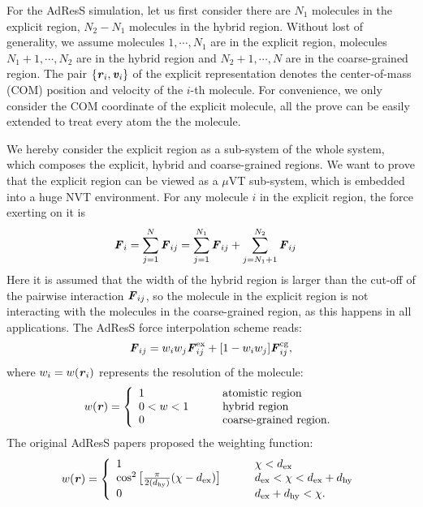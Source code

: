 \documentclass[aps,pre,preprint,unsortedaddress]{revtex4}
\renewcommand{\v}[1]{\textbf{\textit{#1}}}
\begin{document}
For the AdResS simulation, let us first consider there are $N_1$
molecules in the explicit region, $N_2 - N_1$ molecules in the hybrid
region.  Without lost of generality, we assume molecules $1, \cdots,
N_1$ are in the explicit region, molecules $N_1 + 1, \cdots, N_2$ are
in the hybrid region and $N_2+1, \cdots, N$ are in the coarse-grained
region. The pair $\{\v r_i, \v v_i\}$ of the explicit representation
denotes the center-of-mass (COM) position and velocity of the $i$-th
molecule. For convenience, we only consider the COM coordinate of the
explicit molecule, all the prove can be easily extended to treat every
atom the the molecule.

We hereby consider the explicit region as a sub-system of the whole
system, which composes the explicit, hybrid and coarse-grained
regions. We want to prove that the explicit region can be viewed as a
$\mu$VT sub-system, which is embedded into a huge NVT environment.
For any molecule $i$ in the explicit region, the force exerting on
it is
\begin{align}
  \v F_i &= \sum_{j=1}^{N}\v F_{ij} 
  =
  \sum_{j=1}^{N_1}\v F_{ij} + \sum_{j=N_1+1}^{N_2}\v F_{ij} 
\end{align}
Here it is assumed that the width of the hybrid region is larger than
the cut-off of the pairwise interaction $\v F_{ij}$, so the molecule
in the explicit region is not interacting with the molecules in the
coarse-grained region, as this happens in all applications.
The AdResS force interpolation scheme reads:
\begin{align}\label{eqn:f-interp}
  \v F_{ij} = w_iw_j\v F^{\textrm{ex}}_{ij} + [1-w_iw_j]\v F^{\textrm{cg}}_{ij},
\end{align}
where $w_i = w(\v r_i)$ represents
the resolution of the molecule:
\begin{align}\label{eqn:w1}
  w(\v r) =
  \left\{
    \begin{array}{lcl}
      1 &\quad& \textrm{atomistic region}\\
      0<w<1  && \textrm{hybrid region}\\
      0 && \textrm{coarse-grained region}.
    \end{array}
  \right.
\end{align}
The original AdResS papers proposed the weighting function:
\begin{align}\label{eqn:old-w}
  w(\v r) =
  \left\{
    \begin{array}{lcl}
      1 &\quad& \chi < d_{\textrm{ex}}\\
      \cos^2\big[\frac{\pi}{2(d_{\textrm{hy}})} (\chi - d_{\textrm{ex}})\big] && d_{\textrm{ex}}  < \chi < d_{\textrm{ex}} + d_{\textrm{hy}} \\
      0 && d_{\textrm{ex}} + d_{\textrm{hy}}  < \chi.
    \end{array}
  \right.
\end{align}
\end{document}

